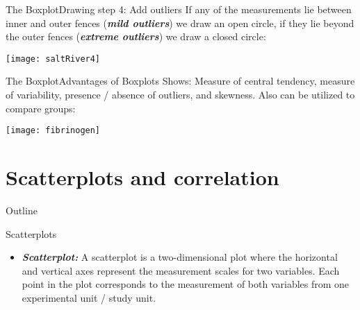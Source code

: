 \documentclass[xcolor=dvipsnames]{beamer}
\begin{document}
\begin{frame}{The Boxplot}{Drawing step 4: Add outliers}
	If any of the measurements lie between inner and outer fences (\textbf{\emph{mild outliers}}) we draw an open circle, if they lie beyond the outer fences (\textbf{\emph{extreme outliers}}) we draw a closed circle:
	\begin{center}
		\texttt{[image: saltRiver4]}
	\end{center}
\end{frame}

\begin{frame}{The Boxplot}{Advantages of Boxplots}
Shows: Measure of central tendency, measure of variability, presence / absence of outliers, and skewness. Also can be utilized to compare groups:

\begin{center}
	\texttt{[image: fibrinogen]}
\end{center}
\end{frame}

\section{Scatterplots and correlation}
\begin{frame}{Outline}
	\tableofcontents[currentsection,subsectionstyle=show/shaded/hide]
\end{frame}

\begin{frame}{Scatterplots}
	\begin{itemize}
		\item \textbf{\emph{Scatterplot:}} A scatterplot is a two-dimensional plot where the horizontal and vertical axes represent the measurement scales for two variables. Each point in the plot corresponds to the measurement of both variables from one experimental unit / study unit.
	\end{itemize}
\end{frame}
\end{document}
